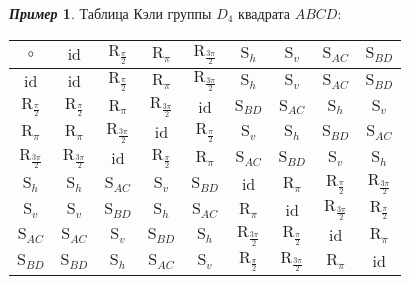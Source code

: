 \documentclass[a4paper, 14pt]{extarticle}
\newcommand{\n}{\par}
\newcommand{\id}{\mathrm{id}}
\newcommand{\Rot}{\mathrm{R}}
\newcommand{\Sym}{\mathrm{S}}
\theoremstyle{definition}
\newtheorem*{exmpl*}{\textit{Пример}}
\theoremstyle{plain}
\numberwithin{theorem}{section}
\numberwithin{definition}{section}
\numberwithin{statement}{section}
\numberwithin{lemma}{section}
\numberwithin{consequence}{section}
\begin{document}
	\begin{exmpl*}
		Таблица Кэли группы $D_4$ квадрата $ABCD{:}$
		\begin{center}
			\begin{tabular}{c|c|c|c|c|c|c|c|c}
				$\circ$ & $\id$ & $\Rot_{\frac{\pi}{2}}$ & $\Rot_{\pi}$ & $\Rot_{\frac{3\pi}{2}}$ & 
				$\Sym_h$ &
				$\Sym_v$ &
				$\Sym_{AC}$ &
				$\Sym_{BD}$ \\
				\hline
				$\id$ & $\id$ & $\Rot_{\frac{\pi}{2}}$ & $\Rot_{\pi}$ & $\Rot_{\frac{3\pi}{2}}$ & 
				$\Sym_h$ &
				$\Sym_v$ &
				$\Sym_{AC}$ &
				$\Sym_{BD}$ \\
				\hline
				$\Rot_{\frac{\pi}{2}}$ & $\Rot_{\frac{\pi}{2}}$ & $\Rot_{\pi}$ & $\Rot_\frac{3\pi}{2}$ & $\id$ & $\Sym_{BD}$ & $\Sym_{AC}$ & $\Sym_h$ & $\Sym_v$ \\
				\hline
				$\Rot_{\pi}$ & $\Rot_{\pi}$ & $\Rot_\frac{3\pi}{2}$ & $\id$ & $\Rot_\frac{\pi}{2}$ & $\Sym_v$ & $\Sym_h$ & $\Sym_{BD}$ & $\Sym_{AC}$ \\ \hline
				$\Rot_\frac{3\pi}{2}$ & $\Rot_\frac{3\pi}{2}$ & $\id$ & $\Rot_\frac{\pi}{2}$ & $\Rot_{\pi}$ & $\Sym_{AC}$ & $\Sym_{BD}$ & $\Sym_v$ & $\Sym_h$ \\
				\hline
				$\Sym_h$ & $\Sym_h$ & $\Sym_{AC}$ & $\Sym_v$ & $\Sym_{BD}$ & $\id$ & $\Rot_{\pi}$ & $\Rot_\frac{\pi}{2}$ & $\Rot_\frac{3\pi}{2}$
				\\
				\hline
				$\Sym_v$ & $\Sym_v$ & $\Sym_{BD}$ & $\Sym_h$ & $\Sym_{AC}$ & $\Rot_{\pi}$ & $\id$ & $\Rot_\frac{3\pi}{2}$ & $\Rot_\frac{\pi}{2}$
				\\
				\hline
				$\Sym_{AC}$ & $\Sym_{AC}$ & $\Sym_v$ & $\Sym_{BD}$ & $\Sym_h$ & $\Rot_\frac{3\pi}{2}$ & $\Rot_\frac{\pi}{2}$ & $\id$ & $\Rot_{\pi}$
				\\
				\hline
				$\Sym_{BD}$ & $\Sym_{BD}$ & $\Sym_h$ & $\Sym_{AC}$ & $\Sym_v$ & $\Rot_\frac{\pi}{2}$ & $\Rot_\frac{3\pi}{2}$ & $\Rot_{\pi}$ & $\id$\\
			\end{tabular}
		\end{center} \n
	\end{exmpl*}
	\newpage
\end{document}
